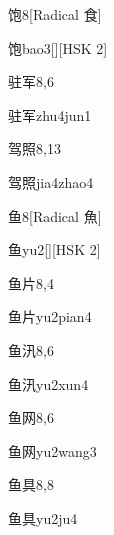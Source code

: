 \begin{entry}{饱}{8}[Radical 食]
  \begin{phonetics}{饱}{bao3}[][HSK 2]
  \end{phonetics}
\end{entry}

\begin{entry}{驻军}{8,6}
  \begin{phonetics}{驻军}{zhu4jun1}
  \end{phonetics}
\end{entry}

\begin{entry}{驾照}{8,13}
  \begin{phonetics}{驾照}{jia4zhao4}
  \end{phonetics}
\end{entry}

\begin{entry}{鱼}{8}[Radical 魚]
  \begin{phonetics}{鱼}{yu2}[][HSK 2]
  \end{phonetics}
\end{entry}

\begin{entry}{鱼片}{8,4}
  \begin{phonetics}{鱼片}{yu2pian4}
  \end{phonetics}
\end{entry}

\begin{entry}{鱼汛}{8,6}
  \begin{phonetics}{鱼汛}{yu2xun4}
  \end{phonetics}
\end{entry}

\begin{entry}{鱼网}{8,6}
  \begin{phonetics}{鱼网}{yu2wang3}
  \end{phonetics}
\end{entry}

\begin{entry}{鱼具}{8,8}
  \begin{phonetics}{鱼具}{yu2ju4}
  \end{phonetics}
\end{entry}

